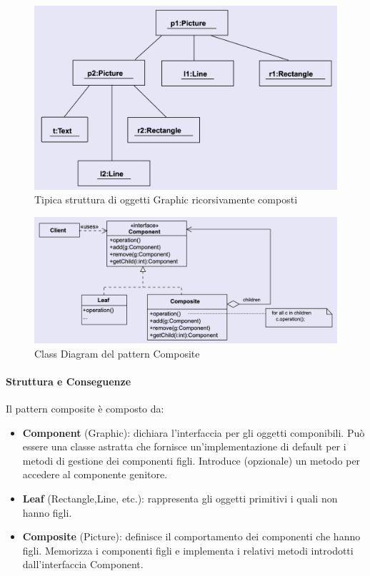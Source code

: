 \begin{figure}[H]
    \centering
    \includegraphics[width=0.5\linewidth]{assets/pattern/composite/composite-object.png}
    \caption{Tipica struttura di oggetti Graphic ricorsivamente composti}
\end{figure}

\newpage

\begin{figure}[H]
    \centering
    \includegraphics[width=1\linewidth]{assets/pattern/composite/composite-struttura.png}
    \caption{Class Diagram del pattern Composite}
\end{figure}

\paragraph{Struttura e Conseguenze} Il pattern composite è composto da:
\begin{itemize}
    \item \textbf{Component} (Graphic): dichiara l’interfaccia per gli oggetti componibili. Può essere una classe astratta che fornisce un’implementazione di default per i metodi di gestione dei componenti figli. Introduce (opzionale) un metodo per accedere al componente genitore. 
    \item \textbf{Leaf} (Rectangle,Line, etc.): rappresenta gli oggetti primitivi i quali non hanno figli. 
    \item \textbf{Composite} (Picture): definisce il comportamento dei componenti che hanno figli. Memorizza i componenti figli e implementa i relativi metodi introdotti dall’interfaccia Component.
\end{itemize}

